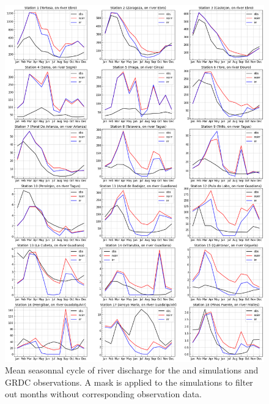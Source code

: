\begin{figure}[htbp]
    \centering
    \includegraphics[width=\textwidth]{images/chap4/18_stations_SC.png}
    \caption{Mean seasonnal cycle of river discharge for the \irr and \noirr simulations and GRDC observations. A mask is applied to the simulations to filter out months without corresponding observation data.}
\end{figure}


